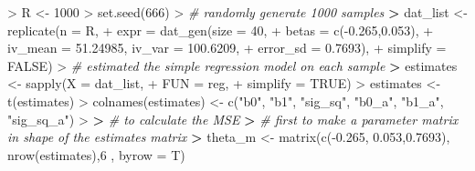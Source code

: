 \documentclass[
]{article}
\newenvironment{Shaded}{\begin{snugshade}}{\end{snugshade}}
\newcommand{\AttributeTok}[1]{\textcolor[rgb]{0.77,0.63,0.00}{#1}}
\newcommand{\CommentTok}[1]{\textcolor[rgb]{0.56,0.35,0.01}{\textit{#1}}}
\newcommand{\ConstantTok}[1]{\textcolor[rgb]{0.00,0.00,0.00}{#1}}
\newcommand{\DecValTok}[1]{\textcolor[rgb]{0.00,0.00,0.81}{#1}}
\newcommand{\ErrorTok}[1]{\textcolor[rgb]{0.64,0.00,0.00}{\textbf{#1}}}
\newcommand{\FloatTok}[1]{\textcolor[rgb]{0.00,0.00,0.81}{#1}}
\newcommand{\FunctionTok}[1]{\textcolor[rgb]{0.00,0.00,0.00}{#1}}
\newcommand{\NormalTok}[1]{#1}
\newcommand{\OtherTok}[1]{\textcolor[rgb]{0.56,0.35,0.01}{#1}}
\newcommand{\SpecialCharTok}[1]{\textcolor[rgb]{0.00,0.00,0.00}{#1}}
\newcommand{\StringTok}[1]{\textcolor[rgb]{0.31,0.60,0.02}{#1}}
\begin{document}
\begin{Shaded}
\begin{Highlighting}[]
\SpecialCharTok{\textgreater{}}\NormalTok{ R }\OtherTok{\textless{}{-}} \DecValTok{1000}
\SpecialCharTok{\textgreater{}} \FunctionTok{set.seed}\NormalTok{(}\DecValTok{666}\NormalTok{)}
\SpecialCharTok{\textgreater{}} \CommentTok{\# randomly generate 1000 samples}
\ErrorTok{\textgreater{}}\NormalTok{ dat\_list }\OtherTok{\textless{}{-}} \FunctionTok{replicate}\NormalTok{(}\AttributeTok{n =}\NormalTok{ R,}
\SpecialCharTok{+}                       \AttributeTok{expr =} \FunctionTok{dat\_gen}\NormalTok{(}\AttributeTok{size =} \DecValTok{40}\NormalTok{,}
\SpecialCharTok{+}                                      \AttributeTok{betas =} \FunctionTok{c}\NormalTok{(}\SpecialCharTok{{-}}\FloatTok{0.265}\NormalTok{,}\FloatTok{0.053}\NormalTok{),}
\SpecialCharTok{+}                                      \AttributeTok{iv\_mean =} \FloatTok{51.24985}\NormalTok{, }\AttributeTok{iv\_var =} \FloatTok{100.6209}\NormalTok{,}
\SpecialCharTok{+}                                      \AttributeTok{error\_sd =} \FloatTok{0.7693}\NormalTok{),}
\SpecialCharTok{+}                       \AttributeTok{simplify =} \ConstantTok{FALSE}\NormalTok{)}
\SpecialCharTok{\textgreater{}} \CommentTok{\# estimated the simple regression model on each sample}
\ErrorTok{\textgreater{}}\NormalTok{ estimates }\OtherTok{\textless{}{-}} \FunctionTok{sapply}\NormalTok{(}\AttributeTok{X =}\NormalTok{ dat\_list,}
\SpecialCharTok{+}                     \AttributeTok{FUN =}\NormalTok{ reg,}
\SpecialCharTok{+}                     \AttributeTok{simplify =} \ConstantTok{TRUE}\NormalTok{)}
\SpecialCharTok{\textgreater{}}\NormalTok{ estimates }\OtherTok{\textless{}{-}} \FunctionTok{t}\NormalTok{(estimates)}
\SpecialCharTok{\textgreater{}} \FunctionTok{colnames}\NormalTok{(estimates) }\OtherTok{\textless{}{-}} \FunctionTok{c}\NormalTok{(}\StringTok{"b0"}\NormalTok{, }\StringTok{"b1"}\NormalTok{, }\StringTok{"sig\_sq"}\NormalTok{, }\StringTok{"b0\_a"}\NormalTok{, }\StringTok{"b1\_a"}\NormalTok{, }\StringTok{"sig\_sq\_a"}\NormalTok{)}
\SpecialCharTok{\textgreater{}} 
\ErrorTok{\textgreater{}} \CommentTok{\# to calculate the MSE}
\ErrorTok{\textgreater{}} \CommentTok{\# first to make a parameter matrix in shape of the estimates matrix}
\ErrorTok{\textgreater{}}\NormalTok{ theta\_m }\OtherTok{\textless{}{-}} \FunctionTok{matrix}\NormalTok{(}\FunctionTok{c}\NormalTok{(}\SpecialCharTok{{-}}\FloatTok{0.265}\NormalTok{, }\FloatTok{0.053}\NormalTok{,}\FloatTok{0.7693}\NormalTok{), }\FunctionTok{nrow}\NormalTok{(estimates),}\DecValTok{6}\NormalTok{ , }\AttributeTok{byrow =}\NormalTok{ T)}

\end{Highlighting}
\end{Shaded}
\end{document}
